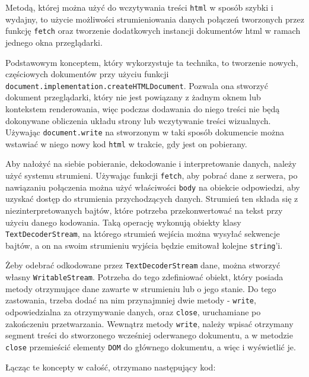 \documentclass[licencjacka]{pracadypl}
\begin{document}
Metodą, której można użyć do wczytywania treści \texttt{html} w sposób szybki i wydajny, to użycie możliwości strumieniowania danych połączeń tworzonych przez funkcję \texttt{fetch} oraz tworzenie dodatkowych instancji dokumentów html w ramach jednego okna przeglądarki.

Podstawowym konceptem, który wykorzystuje ta technika, to tworzenie nowych, częściowych dokumentów przy użyciu funkcji \texttt{document.implementation.createHTMLDocument}. Pozwala ona stworzyć dokument przeglądarki, który nie jest powiązany z żadnym oknem lub kontekstem renderowania, więc podczas dodawania do niego treści nie będą dokonywane obliczenia układu strony lub wczytywanie treści wizualnych. Używając \texttt{document.write} na stworzonym w taki sposób dokumencie można wstawiać w niego nowy kod \texttt{html} w trakcie, gdy jest on pobierany.

Aby nałożyć na siebie pobieranie, dekodowanie i interpretowanie danych, należy użyć systemu strumieni. Używając funkcji \texttt{fetch}, aby pobrać dane z serwera, po nawiązaniu połączenia można użyć właściwości \texttt{body} na obiekcie odpowiedzi, aby uzyskać dostęp do strumienia przychodzących danych. Strumień ten składa się z niezinterpretowanych bajtów, które potrzeba przekonwertować na tekst przy użyciu danego kodowania. Taką operację wykonują obiekty klasy \texttt{TextDecoderStream}, na którego strumień wejścia można wysyłać sekwencje bajtów, a on na swoim strumieniu wyjścia będzie emitował kolejne \texttt{string}'i. 

Żeby odebrać odkodowane przez \texttt{TextDecoderStream} dane, można stworzyć własny \texttt{WritableStream}. Potrzeba do tego zdefiniować obiekt, który posiada metody otrzymujące dane zawarte w strumieniu lub o jego stanie. Do tego zastowania, trzeba dodać na nim przynajmniej dwie metody - \texttt{write}, odpowiedzialna za otrzymywanie danych, oraz \texttt{close}, uruchamiane po zakończeniu przetwarzania. Wewnątrz metody \texttt{write}, należy wpisać otrzymany segment treści do stworzonego wcześniej oderwanego dokumentu, a w metodzie \texttt{close} przemieścić elementy \texttt{DOM} do głównego dokumentu, a więc i wyświetlić je. 

Łącząc te koncepty w całość, otrzymano następujący kod:
\end{document}
